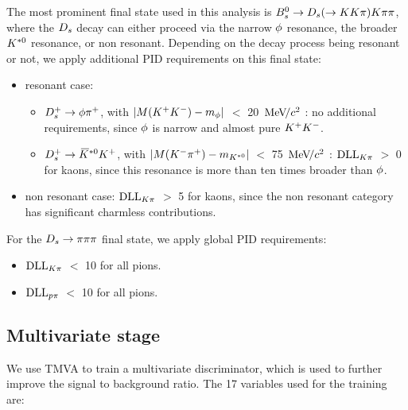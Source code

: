 The most prominent final state used in this analysis is ${{B}^0_{s}}\rightarrow{\ensuremath{{D}_{s}}}(\rightarrow{\ensuremath{K}}{\ensuremath{K}}{\ensuremath{\pi}}){K}{\pi}{\pi}$, 
where the ${{D}_{s}}$ decay can either proceed via the narrow $\phi$ resonance, the broader ${{K}^{*0}}$ resonance, or non resonant.
Depending on the decay process being resonant or not, we apply additional PID requirements on this final state:

\begin{itemize}

\item resonant case: 
\begin{itemize}
\item ${{D}^+_{s}}\rightarrow\phi{\ensuremath{{\pi}^+}}$, with $|M({{K}^+}{{K}^-}) - m_{\phi}|$ $<$ 20 ${\mathrm{\,Me\kern -0.1em V\!/}c^2}$ : no additional requirements, since $\phi$ is narrow and almost pure ${{K}^+}{{K}^-}$. 
\item ${{D}^+_{s}}\rightarrow{\ensuremath{{\kern 0.2em\overline{\kern -0.2em K}{}}{}^{*0}}}{\ensuremath{{K}^+}}$, with  $|M({{K}^-}{{\pi}^+}) -m_{{{K}^{*0}}}|$ $<$ 75 ${\mathrm{\,Me\kern -0.1em V\!/}c^2}$ :  $\mathrm{DLL}_{{K}{\pi}}$ $>$ 0 for kaons, since this resonance is more than ten times broader than $\phi$. 
\end{itemize}

\item non resonant case: $\mathrm{DLL}_{{K}{\pi}}$ $>$ 5 for kaons, since the non resonant category has significant charmless contributions.

\end{itemize}



For the ${{D}_{s}}\rightarrow{\ensuremath{\pi}}{\ensuremath{\pi}}{\ensuremath{\pi}}$ final state, we apply global PID requirements:

\begin{itemize}

\item $\mathrm{DLL}_{{K}{\pi}}$ $<$ 10 for all pions.

\item $\mathrm{DLL}_{{p}{\pi}}$ $<$ 10 for all pions.

\end{itemize}
 


\subsection{Multivariate stage}

We use TMVA \cite{Hocker:2007ht} to train a multivariate discriminator, which is used to further improve the signal to background ratio. 
The 17 variables used for the training are:

